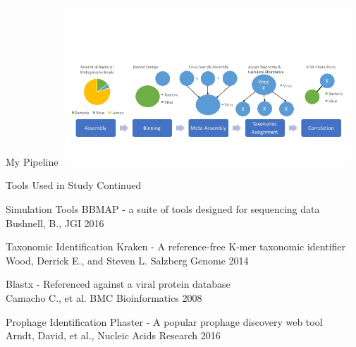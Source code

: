 \documentclass[11pt]{beamer}
\begin{document}
	
	\begin{frame}{My Pipeline}
	\vspace{-1cm}
	\includegraphics[height=6cm, width=11cm]{figure_2_updated.jpg}
	\end{frame}
	
	
	\begin{frame}{Tools Used in Study Continued}
	\begin{block}{Simulation Tools}
	BBMAP - a suite of tools designed for sequencing data \\
	\tiny{Bushnell, B., JGI 2016}
	\end{block}
	
	\begin{block}{Taxonomic Identification}
	Kraken - A reference-free K-mer taxonomic identifier \\
	\tiny{Wood, Derrick E., and Steven L. Salzberg Genome 2014}
	
	\large{Blastx - Referenced against a viral protein database} \\
	\tiny{Camacho C., et al. BMC Bioinformatics 2008}
	\end{block}
	
	\begin{block}{Prophage Identification}
	Phaster - A popular prophage discovery web tool  \\
	\tiny{Arndt, David, et al., Nucleic Acids Research 2016}
	\end{block}
	\end{frame}
	
	
	
\end{document}
